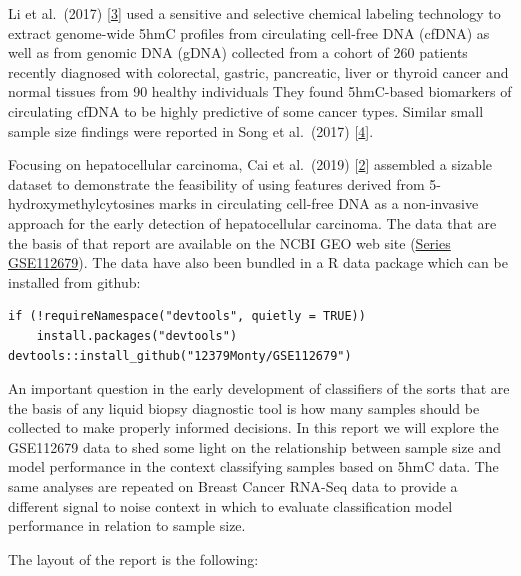 \documentclass[
]{book}
\begin{document}
Li et al.~(2017) {[}\protect\hyperlink{ref-Li:2017aa}{3}{]} used a sensitive and selective chemical labeling technology
to extract genome-wide 5hmC profiles from circulating cell-free DNA (cfDNA)
as well as from genomic DNA (gDNA)
collected from a cohort of 260 patients recently diagnosed with colorectal,
gastric, pancreatic, liver or thyroid cancer and normal tissues from 90 healthy individuals
They found 5hmC-based biomarkers of circulating cfDNA to be highly predictive of some cancer types.
Similar small sample size findings were reported in Song et al.~(2017) {[}\protect\hyperlink{ref-Song:2017aa}{4}{]}.

Focusing on hepatocellular carcinoma, Cai et al.~(2019) {[}\protect\hyperlink{ref-Cai:2019aa}{2}{]} assembled a sizable dataset
to demonstrate the feasibility of using features derived from
5-hydroxymethylcytosines marks in circulating cell-free DNA as
a non-invasive approach for the early detection of
hepatocellular carcinoma. The data that are the basis of that
report are available on the NCBI GEO web site
(\href{https://www.ncbi.nlm.nih.gov/geo/query/acc.cgi?acc=GSE112679}{Series GSE112679}).
The data have also been bundled in a R data package which can be installed from github:

\begin{verbatim}
if (!requireNamespace("devtools", quietly = TRUE))
    install.packages("devtools")
devtools::install_github("12379Monty/GSE112679")
\end{verbatim}

An important question in the early development of classifiers of the sorts
that are the basis of any liquid biopsy diagnostic tool is how many samples
should be collected to make properly informed decisions. In this
report we will explore the GSE112679 data to shed some light on
the relationship between sample size and model performance
in the context classifying samples based on 5hmC data.
The same analyses are repeated on Breast Cancer RNA-Seq data
to provide a different signal to noise context in which to evaluate
classification model performance in relation to sample size.

The layout of the report is the following:
\end{document}
